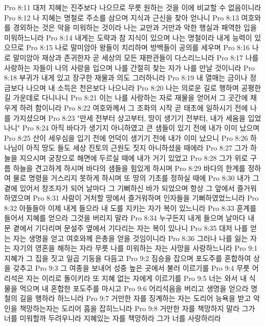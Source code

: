 Pro 8:11  대저 지혜는 진주보다 나으므로 무릇 원하는 것을 이에 비교할 수 없음이니라
Pro 8:12  나 지혜는 명철로 주소를 삼으며 지식과 근신을 찾아 얻나니
Pro 8:13  여호와를 경외하는 것은 악을 미워하는 것이라 나는 교만과 거만과 악한 행실과 패역한 입을 미워하느니라
Pro 8:14  내게는 도략과 참 지식이 있으며 나는 명철이라 내게 능력이 있으므로
Pro 8:15  나로 말미암아 왕들이 치리하며 방백들이 공의를 세우며
Pro 8:16  나로 말미암아 재상과 존귀한자 곧 세상의 모든 재판관들이 다스리느니라
Pro 8:17  나를 사랑하는 자들이 나의 사랑을 입으며 나를 간절히 찾는 자가 나를 만날 것이니라
Pro 8:18  부귀가 내게 있고 장구한 재물과 의도 그러하니라
Pro 8:19  내 열매는 금이나 정금보다 나으며 내 소득은 천은보다 나으니라
Pro 8:20  나는 의로운 길로 행하며 공평한 길 가운데로 다니나니
Pro 8:21  이는 나를 사랑하는 자로 재물을 얻어서 그 곳간에 채우게 하려 함이니라
Pro 8:22  여호와께서 그 조화의 시작 곧 태초에 일하시기 전에 나를 가지셨으며
Pro 8:23  "만세 전부터 상고부터, 땅이 생기기 전부터, 내가 세움을 입었나니"
Pro 8:24  아직 바다가 생기지 아니하였고 큰 샘들이 있기 전에 내가 이미 났으며
Pro 8:25  산이 세우심을 입기 전에 언덕이 생기기 전에 내가 이미 났으니
Pro 8:26  하나님이 아직 땅도 들도 세상 진토의 근원도 짓지 아니하셨을 때에라
Pro 8:27  그가 하늘을 지으시며 궁창으로 해면에 두르실 때에 내가 거기 있었고
Pro 8:28  그가 위로 구름 하늘을 견고하게 하시며 바다의 샘들을 힘있게 하시며
Pro 8:29  바다의 한계를 정하여 물로 명령을 거스리지 못하게 하시며 또 땅의 기초를 정하실 때에
Pro 8:30  내가 그 곁에 있어서 창조자가 되어 날마다 그 기뻐하신 바가 되었으며 항상 그 앞에서 즐거워하였으며
Pro 8:31  사람이 거처할 땅에서 즐거워하며 인자들을 기뻐하였었느니라
Pro 8:32  아들들아 이제 내게 들으라 내 도를 지키는 자가 복이 있느니라
Pro 8:33  훈계를 들어서 지혜를 얻으라 그것을 버리지 말라
Pro 8:34  누구든지 내게 들으며 날마다 내 문 곁에서 기다리며 문설주 옆에서 기다리는 자는 복이 있나니
Pro 8:35  대저 나를 얻는 자는 생명을 얻고 여호와께 은총을 얻을 것임이니라
Pro 8:36  그러나 나를 잃는 자는 자기의 영혼을 해하는 자라 무릇 나를 미워하는 자는 사망을 사랑하느니라
Pro 9:1  지혜가 그 집을 짓고 일곱 기둥을 다듬고
Pro 9:2  짐승을 잡으며 포도주를 혼합하여 상을 갖추고
Pro 9:3  그 여종을 보내어 성중 높은 곳에서 불러 이르기를
Pro 9:4  무릇 어리석은 자는 이리로 돌이키라 또 지혜 없는 자에게 이르기를
Pro 9:5  너는 와서 내 식물을 먹으며 내 혼합한 포도주를 마시고
Pro 9:6  어리석음을 버리고 생명을 얻으라 명철의 길을 행하라 하느니라
Pro 9:7  거만한 자를 징계하는 자는 도리어 능욕을 받고 악인을 책망하는자는 도리어 흠을 잡히느니라
Pro 9:8  거만한 자를 책망하지 말라 그가 너를 미워할까 두려우니라 지혜있는 자를 책망하라 그가 너를 사랑하리라
